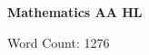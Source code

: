 \begin{titlepage}
	\begin{center}
		\vspace*{0.5cm}
		\Large\textbf{\researchquestion}

		\vspace{1.5cm}
		\large\textbf{Mathematics AA HL}

		\vfill
		\color{darkgray} Word Count: 1276
	\end{center}
\end{titlepage}

\tableofcontents\newpage